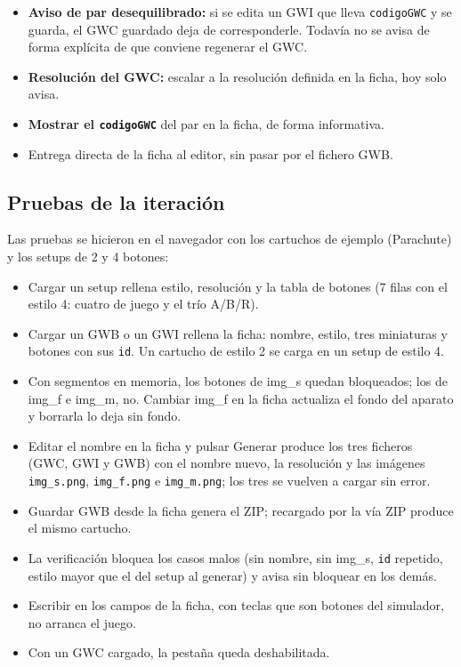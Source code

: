 \begin{itemize}
	\item \textbf{Aviso de par desequilibrado:} si se edita un GWI que lleva \texttt{codigoGWC} y se guarda, el GWC guardado deja de corresponderle. Todavía no se avisa de forma explícita de que conviene regenerar el GWC.
	
	\item \textbf{Resolución del GWC:} escalar a la resolución definida en la ficha, hoy solo avisa. 
	
	\item \textbf{Mostrar el \texttt{codigoGWC}} del par en la ficha, de forma informativa. 
	
	\item Entrega directa de la ficha al editor, sin pasar por el fichero GWB.
\end{itemize}

\subsection{Pruebas de la iteración}
\label{sec:F5I10Pruebas}

Las pruebas se hicieron en el navegador con los cartuchos de ejemplo (Parachute) y los setups de 2 y 4 botones:

\begin{itemize}
	\item Cargar un setup rellena estilo, resolución y la tabla de botones (7 filas con el estilo 4: cuatro de juego y el trío A/B/R).
	
	\item Cargar un GWB o un GWI rellena la ficha: nombre, estilo, tres miniaturas y botones con sus \texttt{id}. Un cartucho de estilo 2 se carga en un setup de estilo 4.
	
	\item Con segmentos en memoria, los botones de img\_s quedan bloqueados; los de img\_f e img\_m, no. Cambiar img\_f en la ficha actualiza el fondo del aparato y borrarla lo deja sin fondo.
	
	\item Editar el nombre en la ficha y pulsar Generar produce los tres ficheros (GWC, GWI y GWB) con el nombre nuevo, la resolución y las imágenes \texttt{img\_s.png}, \texttt{img\_f.png} e \texttt{img\_m.png}; los tres se vuelven a cargar sin error.
	
	\item Guardar GWB desde la ficha genera el ZIP; recargado por la vía ZIP produce el mismo cartucho.
	
	\item La verificación bloquea los casos malos (sin nombre, sin img\_s, \texttt{id} repetido, estilo mayor que el del setup al generar) y avisa sin bloquear en los demás.
	
	\item Escribir en los campos de la ficha, con teclas que son botones del simulador, no arranca el juego.
	
	\item Con un GWC cargado, la pestaña queda deshabilitada.
\end{itemize}